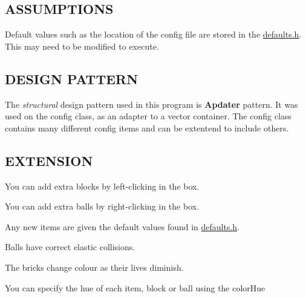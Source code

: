 \subsection*{A\-S\-S\-U\-M\-P\-T\-I\-O\-N\-S}


\begin{DoxyItemize}
\item Default values such as the location of the config file are stored in the \hyperlink{defaults_8h_source}{defaults.\-h}. This may need to be modified to execute.
\end{DoxyItemize}

\subsection*{D\-E\-S\-I\-G\-N P\-A\-T\-T\-E\-R\-N}

The {\itshape structural} design pattern used in this program is {\bfseries Apdater} pattern. It was used on the config class, as an adapter to a vector container. The config class contains many different config items and can be extentend to include others.

\subsection*{E\-X\-T\-E\-N\-S\-I\-O\-N}


\begin{DoxyItemize}
\item You can add extra blocks by left-\/clicking in the box.
\item You can add extra balls by right-\/clicking in the box.
\item Any new items are given the default values found in \hyperlink{defaults_8h_source}{defaults.\-h}.
\item Balls have correct elastic collisions.
\item The bricks change colour as their lives diminish.
\item You can specify the hue of each item, block or ball using the color\-Hue 
\end{DoxyItemize}